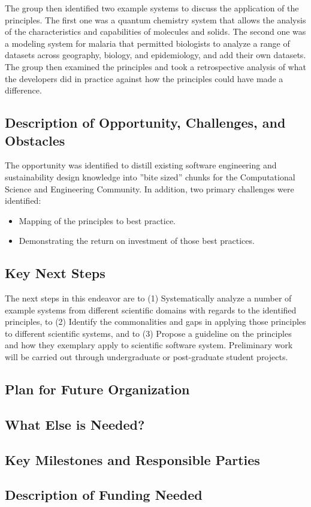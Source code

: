 The group then identified two example systems to discuss the application of the principles. The first one was a quantum chemistry system that allows the analysis of the characteristics and capabilities of molecules and solids. The second one was a modeling system for malaria that permitted biologists to analyze a range of datasets across geography, biology, and epidemiology, and add their own datasets. The group then examined the principles and took a retrospective analysis of what the developers did in practice against how the principles could have made a difference. 

\subsection{Description of Opportunity, Challenges, and Obstacles}
The opportunity was identified to distill existing software engineering and sustainability design knowledge into ''bite sized'' chunks for the Computational Science and Engineering Community. In addition, two primary challenges were identified:
\begin{itemize}
\item Mapping of the principles to best practice.
\item Demonstrating the return on investment of those best practices.
\end{itemize}

\subsection{Key Next Steps}
The next steps in this endeavor are to (1) Systematically analyze a number of example systems from different scientific domains with regards to the identified principles, to (2) Identify the commonalities and gaps in applying those principles to different scientific systems, and to (3) Propose a guideline on the principles and how they exemplary apply to scientific software system. Preliminary work will be carried out through undergraduate or post-graduate student projects.

\subsection{Plan for Future Organization}


\subsection{What Else is Needed?}


\subsection{Key Milestones and Responsible Parties}


\subsection{Description of Funding Needed}
